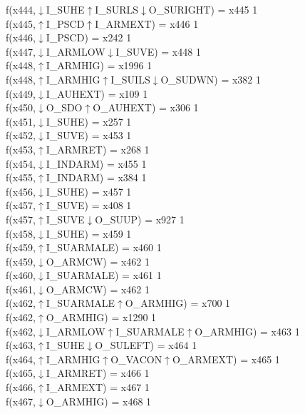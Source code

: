 f(x444,$\downarrow$I\_SUHE$\uparrow$I\_SURLS$\downarrow$O\_SURIGHT) = x445 {1} \\
f(x445,$\uparrow$I\_PSCD$\uparrow$I\_ARMEXT) = x446 {1} \\
f(x446,$\downarrow$I\_PSCD) = x242 {1} \\
f(x447,$\downarrow$I\_ARMLOW$\downarrow$I\_SUVE) = x448 {1} \\
f(x448,$\uparrow$I\_ARMHIG) = x1996 {1} \\
f(x448,$\uparrow$I\_ARMHIG$\uparrow$I\_SUILS$\downarrow$O\_SUDWN) = x382 {1} \\
f(x449,$\downarrow$I\_AUHEXT) = x109 {1} \\
f(x450,$\downarrow$O\_SDO$\uparrow$O\_AUHEXT) = x306 {1} \\
f(x451,$\downarrow$I\_SUHE) = x257 {1} \\
f(x452,$\downarrow$I\_SUVE) = x453 {1} \\
f(x453,$\uparrow$I\_ARMRET) = x268 {1} \\
f(x454,$\downarrow$I\_INDARM) = x455 {1} \\
f(x455,$\uparrow$I\_INDARM) = x384 {1} \\
f(x456,$\downarrow$I\_SUHE) = x457 {1} \\
f(x457,$\uparrow$I\_SUVE) = x408 {1} \\
f(x457,$\uparrow$I\_SUVE$\downarrow$O\_SUUP) = x927 {1} \\
f(x458,$\downarrow$I\_SUHE) = x459 {1} \\
f(x459,$\uparrow$I\_SUARMALE) = x460 {1} \\
f(x459,$\downarrow$O\_ARMCW) = x462 {1} \\
f(x460,$\downarrow$I\_SUARMALE) = x461 {1} \\
f(x461,$\downarrow$O\_ARMCW) = x462 {1} \\
f(x462,$\uparrow$I\_SUARMALE$\uparrow$O\_ARMHIG) = x700 {1} \\
f(x462,$\uparrow$O\_ARMHIG) = x1290 {1} \\
f(x462,$\downarrow$I\_ARMLOW$\uparrow$I\_SUARMALE$\uparrow$O\_ARMHIG) = x463 {1} \\
f(x463,$\uparrow$I\_SUHE$\downarrow$O\_SULEFT) = x464 {1} \\
f(x464,$\uparrow$I\_ARMHIG$\uparrow$O\_VACON$\uparrow$O\_ARMEXT) = x465 {1} \\
f(x465,$\downarrow$I\_ARMRET) = x466 {1} \\
f(x466,$\uparrow$I\_ARMEXT) = x467 {1} \\
f(x467,$\downarrow$O\_ARMHIG) = x468 {1} \\
